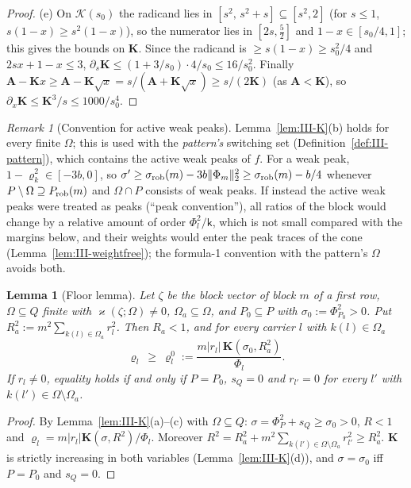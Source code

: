 \documentclass[10pt]{amsart}
\newtheorem{lemma}[theorem]{Lemma}
\theoremstyle{definition}
\theoremstyle{remark}
\newtheorem{remark}[theorem]{Remark}
\begin{document}
\begin{proof}
(e) On $\mathcal K(s_0)$ the radicand lies in $[s^2,\,s^2+s]\subseteq[s^2,2]$
(for $s\le1$, $s(1-x)\ge s^2(1-x)$), so the numerator lies in $[2s,\frac52]$
and $1-x\in[s_0/4,1]$; this gives the bounds on $\mathbf K$.  Since the
radicand is $\ge s(1-x)\ge s_0^2/4$ and $2sx+1-x\le3$, $\partial_s\mathbf K\le
(1+3/s_0)\cdot4/s_0\le16/s_0^2$.  Finally $\mathbf A-\mathbf Kx\ge\mathbf A-
\mathbf K\sqrt x=s/(\mathbf A+\mathbf K\sqrt x)\ge s/(2\mathbf K)$ (as $\mathbf
A<\mathbf K$), so $\partial_x\mathbf K\le\mathbf K^3/s\le1000/s_0^4$.
\end{proof}

\begin{remark}[Convention for active weak peaks]\label{rem:III-K1}
Lemma~\ref{lem:III-K}(b) holds for every finite $\Omega$; this is used with
the \emph{pattern's} switching set (Definition~\ref{def:III-pattern}), which
contains the active weak peaks of $f$.  For a weak peak, $1-\varrho_k^2\in
[-3b,0]$, so $\sigma'\ge\sigma_{\rm rob}(m)-3b\|\Phi_m\|_2^2\ge\sigma_{\rm rob}(m)-
b/4$ whenever $P\setminus\Omega\supseteq P_{\rm rob}(m)$ and $\Omega\cap P$ consists
of weak peaks.  If instead the active
weak peaks were treated as peaks (``peak convention''), all ratios of the
block would change by a relative amount of order $\Phi_l^2/\mathsf k$, which is
not small compared with the margins below, and their weights would enter
the peak traces of the cone (Lemma~\ref{lem:III-weightfree}); the formula-1
convention with the pattern's $\Omega$ avoids both.
\end{remark}

\begin{lemma}[Floor lemma]\label{lem:III-floor}
Let $\zeta$ be the block vector of block $m$ of a first row, $\Omega\subseteq Q$
finite with $\varkappa(\zeta;\Omega)\ne0$, $\Omega_a\subseteq\Omega$, and
$P_0\subseteq P$ with $\sigma_0:=\Phi_{P_0}^2>0$.  Put $R_a^2:=m^2\sum_{k(l)\in
\Omega_a}r_l^2$.  Then $R_a<1$, and for every carrier $l$ with $k(l)\in\Omega_a$
\[
 \varrho_l\ \ge\ \varrho^0_l:=\frac{m|r_l|\,\mathbf K(\sigma_0,R_a^2)}{\Phi_l}.
\]
If $r_l\ne0$, equality holds if and only if $P=P_0$, $s_Q=0$ and $r_{l'}=0$
for every $l'$ with $k(l')\in\Omega\setminus\Omega_a$.
\end{lemma}

\begin{proof}
By Lemma~\ref{lem:III-K}(a)--(c) with $\Omega\subseteq Q$: $\sigma=\Phi_P^2+s_Q\ge
\sigma_0>0$, $R<1$ and $\varrho_l=m|r_l|\mathbf K(\sigma,R^2)/\Phi_l$.  Moreover
$R^2=R_a^2+m^2\sum_{k(l')\in\Omega\setminus\Omega_a}r_{l'}^2\ge R_a^2$.  $\mathbf K$
is strictly increasing in both variables (Lemma~\ref{lem:III-K}(d)), and
$\sigma=\sigma_0$ iff $P=P_0$ and $s_Q=0$.
\end{proof}
\end{document}
